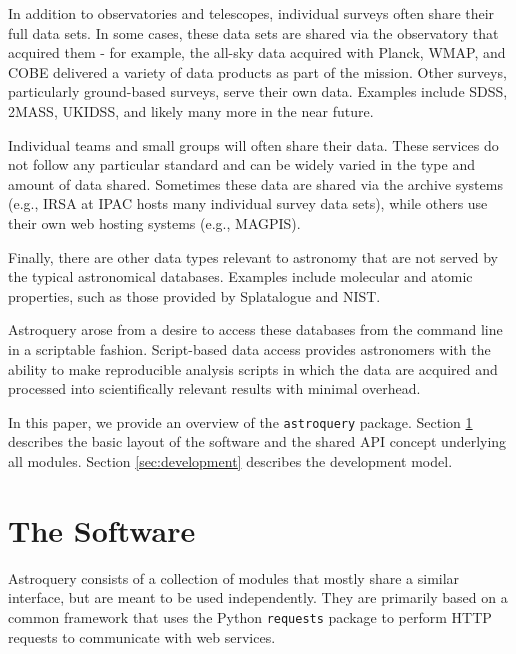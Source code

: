 \documentclass[twocolumn]{aastex61}
\newcommand{\package}[1]{\texttt{#1}\xspace}
\newcommand{\astroquery}{\package{astroquery}}
\begin{document}
In addition to observatories and telescopes, individual surveys often share
their full data sets.  In some cases, these data sets are shared via the
observatory that acquired them - for example, the all-sky data acquired with
Planck, WMAP, and COBE delivered a variety of data products as part of the
mission.  Other surveys, particularly ground-based surveys, serve their own
data.  Examples include SDSS, 2MASS, UKIDSS, and likely many more in the near future.

Individual teams and small groups will often share their data.
These services do not follow any particular standard and can be widely
varied in the type and amount of data shared.  Sometimes these data
are shared via the archive systems (e.g., IRSA at IPAC hosts many
individual survey data sets), while others use their own web hosting
systems (e.g., MAGPIS).

Finally, there are other data types relevant to astronomy that are not
served by the typical astronomical databases.  Examples include molecular
and atomic properties, such as those provided by Splatalogue and NIST.

Astroquery arose from a desire to access these databases from the command line
in a scriptable fashion.  Script-based data access provides astronomers with
the ability to make reproducible analysis scripts in which the data are
acquired and processed into scientifically relevant results with minimal
overhead.

In this paper, we provide an overview of the \astroquery package.
Section \ref{sec:software} describes the basic layout of the software and
the shared API concept underlying all modules.  Section \ref{sec:development}
describes the development model.



\section{The Software}
\label{sec:software}
Astroquery consists of a collection of modules that mostly share a similar
interface, but are meant to be used independently.  They are primarily based on
a common framework that uses the Python \texttt{requests} package to perform
HTTP requests to communicate with web services.
\end{document}
